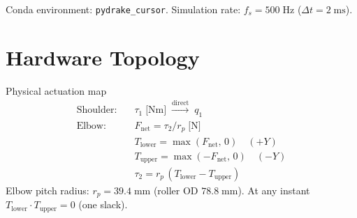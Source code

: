 \documentclass[11pt,a4paper]{article}
\begin{document}
Conda environment: \texttt{pydrake\_cursor}.  Simulation rate: $f_s = 500\;\mathrm{Hz}$
($\Delta t = 2\;\mathrm{ms}$).

\section{Hardware Topology}

\begin{archbox}{Physical actuation map}
\[
  \boxed{
    \begin{aligned}
      \text{Shoulder:}\quad & \tau_1 \;\text{[Nm]} \;\xrightarrow{\text{direct}}\; q_1 \\
      \text{Elbow:}\quad    & F_{\mathrm{net}} = \tau_2 / r_p \;\text{[N]} \\
                            & T_{\mathrm{lower}} = \max(F_{\mathrm{net}},\, 0) \quad (+Y) \\
                            & T_{\mathrm{upper}} = \max(-F_{\mathrm{net}},\, 0) \quad (-Y) \\
                            & \tau_2 = r_p\,(T_{\mathrm{lower}} - T_{\mathrm{upper}})
    \end{aligned}
  }
\]
Elbow pitch radius: $r_p = 39.4\;\mathrm{mm}$ (roller OD $78.8\;\mathrm{mm}$).
At any instant $T_{\mathrm{lower}}\cdot T_{\mathrm{upper}} = 0$ (one slack).
\end{archbox}
\end{document}
